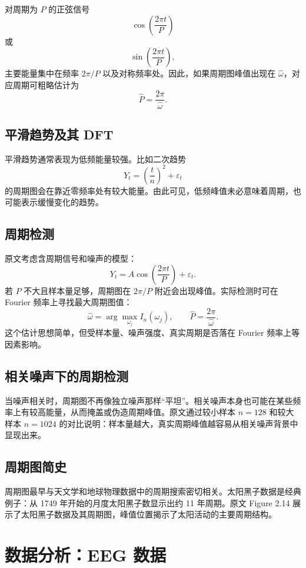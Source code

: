 \documentclass[11pt,a4paper,openany]{ctexbook}
\begin{document}
对周期为 \(P\) 的正弦信号
\[
  \cos\left(\frac{2\pi t}{P}\right)
\]
或
\[
  \sin\left(\frac{2\pi t}{P}\right),
\]
主要能量集中在频率 \(2\pi/P\) 以及对称频率处。因此，如果周期图峰值出现在 \(\hat{\omega}\)，对应周期可粗略估计为
\[
  \hat{P}=\frac{2\pi}{\hat{\omega}}.
\]

\subsection{平滑趋势及其 DFT}

平滑趋势通常表现为低频能量较强。比如二次趋势
\[
  Y_t=\left(\frac{t}{n}\right)^2+\varepsilon_t
\]
的周期图会在靠近零频率处有较大能量。由此可见，低频峰值未必意味着周期，也可能表示缓慢变化的趋势。

\subsection{周期检测}

原文考虑含周期信号和噪声的模型：
\[
  Y_t=A\cos\left(\frac{2\pi t}{P}\right)+\varepsilon_t.
\]
若 \(P\) 不大且样本量足够，周期图在 \(2\pi/P\) 附近会出现峰值。实际检测时可在 Fourier 频率上寻找最大周期图值：
\[
  \hat{\omega}
  =\arg\max_{\omega_j} I_n(\omega_j),
  \qquad
  \hat{P}=\frac{2\pi}{\hat{\omega}}.
\]
这个估计思想简单，但受样本量、噪声强度、真实周期是否落在 Fourier 频率上等因素影响。

\subsection{相关噪声下的周期检测}

当噪声相关时，周期图不再像独立噪声那样“平坦”。相关噪声本身也可能在某些频率上有较高能量，从而掩盖或伪造周期峰值。原文通过较小样本 \(n=128\) 和较大样本 \(n=1024\) 的对比说明：样本量越大，真实周期峰值越容易从相关噪声背景中显现出来。

\subsection{周期图简史}

周期图最早与天文学和地球物理数据中的周期搜索密切相关。太阳黑子数据是经典例子：从 1749 年开始的月度太阳黑子数显示出约 11 年周期。原文 Figure 2.14 展示了太阳黑子数据及其周期图，峰值位置揭示了太阳活动的主要周期结构。

\section{数据分析：EEG 数据}
\end{document}

